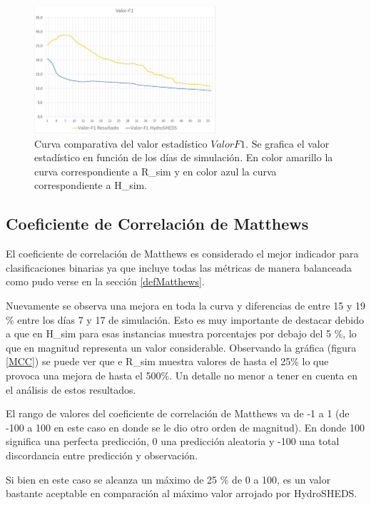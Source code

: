 \documentclass[10pt,a4paper, twoside]{report}
\begin{document}
\begin{figure}[H]
   \centering      
   \includegraphics[width=0.6\textwidth]{imagenes/F1Score.jpg}
 \caption{Curva comparativa del valor estadístico $Valor F1$. Se grafica el valor estadístico en función de los días de simulación. En color amarillo la curva correspondiente a R\_sim y en color azul la curva correspondiente a H\_sim.}
 \label{F1Score}
\end{figure}


\subsection{Coeficiente de Correlación de Matthews}

El coeficiente de correlación de Matthews es considerado el mejor indicador para clasificaciones binarias ya que incluye todas las métricas de manera balanceada como pudo verse en la sección \ref{defMatthews}.

Nuevamente se observa una mejora en toda la curva y diferencias de entre 15 y 19 \% entre los días 7 y 17 de simulación. Esto es muy importante de destacar debido a que en H\_sim para esas instancias muestra porcentajes por debajo del 5 \%, lo que en magnitud representa un valor considerable. Observando la gráfica (figura \ref{MCC}) se puede ver que e R\_sim muestra valores de hasta el 25\% lo que provoca una mejora de hasta el 500\%. Un detalle no menor a tener en cuenta en el análisis de estos resultados.

El rango de valores del coeficiente de correlación de Matthews va de -1 a 1 (de -100 a 100 en este caso en donde se le dio otro orden de magnitud). En donde 100 significa una perfecta predicción, 0 una predicción aleatoria y -100 una total discordancia entre predicción y observación. 

Si bien en este caso se alcanza un máximo de 25 \% de 0 a 100, es un valor bastante aceptable en comparación al máximo valor arrojado por HydroSHEDS.
\end{document}
